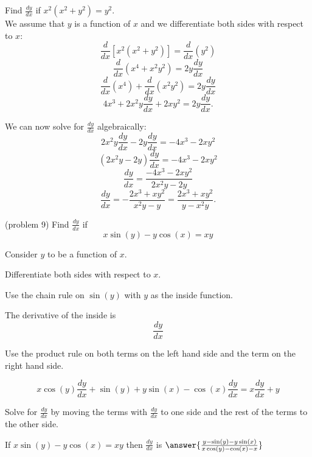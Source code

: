 \documentclass[handout]{ximera}
\begin{document}
\begin{example}[example 9]
Find  $\frac{dy}{dx}$ if $x^2(x^2 + y^2) =y^2$.\\
We assume that $y$ is a function of $x$ and we differentiate both 
sides with respect to $x$:
\[\frac{d}{dx}[x^2(x^2 + y^2)]  = \frac{d}{dx} (y^2 )\]
\[\frac{d}{dx}(x^4 + x^2y^2) = 2y\frac{dy}{dx}\]
\[\frac{d}{dx}(x^4) + \frac{d}{dx}(x^2y^2)  = 2y\frac{dy}{dx}\]
\[4x^3 + 2x^2y\frac{dy}{dx} + 2xy^2  = 2y\frac{dy}{dx}.\]

We can now solve for $\displaystyle{\frac{dy}{dx}}$ algebraically:
\[2x^2y\frac{dy}{dx} - 2y\frac{dy}{dx}= -4x^3 - 2xy^2\]
\[(2x^2y- 2y)\frac{dy}{dx}= -4x^3 - 2xy^2\]
\[\frac{dy}{dx}= \frac{-4x^3 - 2xy^2}{2x^2y- 2y}\]
\[\frac{dy}{dx}= -\frac{2x^3 + xy^2}{x^2y- y}= 
\frac{2x^3 + xy^2}{y - x^2y}.\]
\end{example}


\begin{center}
\begin{foldable}
\end{foldable}
\end{center}



\begin{problem}(problem 9)
  Find $\frac{dy}{dx}$ if
  \[
  x\sin(y) - y\cos(x) = xy
  \]
  
	  
    \begin{hint}
      Consider $y$ to be a function of $x$.
    \end{hint}
		\begin{hint}
		  Differentiate both sides with respect to $x$.
		\end{hint}
    \begin{hint}
      Use the chain rule on $\sin(y)$ with $y$ as the inside function.
    \end{hint}
    \begin{hint}
      The derivative of the inside is 
      \[
      \frac{dy}{dx}
      \]
    \end{hint}
		\begin{hint}
      Use the product rule on both terms on the left hand side and the term on the right hand side.
    \end{hint}
		\begin{hint}
		  \[
			x\cos(y)\frac{dy}{dx} + \sin(y) + y\sin(x) - \cos(x)\frac{dy}{dx} = 
			x\frac{dy}{dx} + y
			\]
		\end{hint}
		\begin{hint}
		  Solve for $\frac{dy}{dx}$ by moving the terms with $\frac{dy}{dx}$ to one side and the 
			rest of the terms to the other side.
		\end{hint}
    
		If $x\sin(y) - y\cos(x) = xy$ then $\frac{dy}{dx}$ is
		 $\answer{\frac{y - \sin(y) - y\sin(x)}{x\cos(y) -\cos(x) -x}}$
		
\end{problem}
\end{document}
